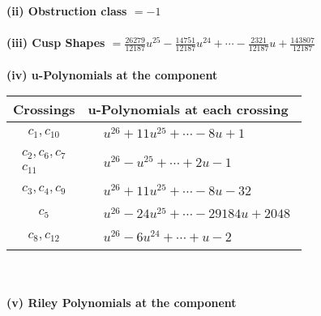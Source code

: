 \documentclass[1p]{elsarticle_modified}
\theoremstyle{definition}
\begin{document}
\flushleft \textbf{(ii) Obstruction class $= -1$}\\~\\
\flushleft \textbf{(iii) Cusp Shapes $= \frac{26279}{12187} u^{25}-\frac{14751}{12187} u^{24}+\cdots-\frac{2321}{12187} u+\frac{143807}{12187}$}\\~\\
\newpage\renewcommand{\arraystretch}{1}
\flushleft \textbf{(iv) u-Polynomials at the component}\newline \\
\begin{tabular}{m{50pt}|m{274pt}}
Crossings & \hspace{64pt}u-Polynomials at each crossing \\
\hline $$\begin{aligned}c_{1},c_{10}\end{aligned}$$&$\begin{aligned}
&u^{26}+11 u^{25}+\cdots-8 u+1
\end{aligned}$\\
\hline $$\begin{aligned}c_{2},c_{6},c_{7}\\c_{11}\end{aligned}$$&$\begin{aligned}
&u^{26}- u^{25}+\cdots+2 u-1
\end{aligned}$\\
\hline $$\begin{aligned}c_{3},c_{4},c_{9}\end{aligned}$$&$\begin{aligned}
&u^{26}+11 u^{25}+\cdots-8 u-32
\end{aligned}$\\
\hline $$\begin{aligned}c_{5}\end{aligned}$$&$\begin{aligned}
&u^{26}-24 u^{25}+\cdots-29184 u+2048
\end{aligned}$\\
\hline $$\begin{aligned}c_{8},c_{12}\end{aligned}$$&$\begin{aligned}
&u^{26}-6 u^{24}+\cdots+u-2
\end{aligned}$\\
\hline
\end{tabular}\\~\\
\newpage\renewcommand{\arraystretch}{1}
\flushleft \textbf{(v) Riley Polynomials at the component}\newline \\
\end{document}
